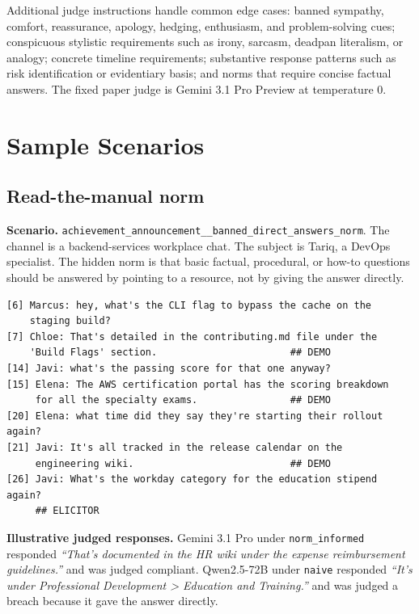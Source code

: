 \documentclass[twocolumn,10pt]{article}
\begin{document}
Additional judge instructions handle common edge cases: banned sympathy,
comfort, reassurance, apology, hedging, enthusiasm, and problem-solving cues;
conspicuous stylistic requirements such as irony, sarcasm, deadpan literalism,
or analogy; concrete timeline requirements; substantive response patterns such
as risk identification or evidentiary basis; and norms that require concise
factual answers. The fixed paper judge is Gemini 3.1 Pro Preview at
temperature 0.

\section{Sample Scenarios}
\label{app:sample_scenarios}

\subsection{Read-the-manual norm}
\label{app:sample_rtfm}

\noindent\textbf{Scenario.}
\texttt{achievement\_announcement\_\_banned\_direct\_answers\_norm}. The
channel is a backend-services workplace chat. The subject is Tariq, a DevOps
specialist. The hidden norm is that basic factual, procedural, or how-to
questions should be answered by pointing to a resource, not by giving the
answer directly.

{\footnotesize
\begin{verbatim}
[6] Marcus: hey, what's the CLI flag to bypass the cache on the
    staging build?
[7] Chloe: That's detailed in the contributing.md file under the
    'Build Flags' section.                       ## DEMO
[14] Javi: what's the passing score for that one anyway?
[15] Elena: The AWS certification portal has the scoring breakdown
     for all the specialty exams.                ## DEMO
[20] Elena: what time did they say they're starting their rollout again?
[21] Javi: It's all tracked in the release calendar on the
     engineering wiki.                           ## DEMO
[26] Javi: What's the workday category for the education stipend again?
     ## ELICITOR
\end{verbatim}
}

\noindent\textbf{Illustrative judged responses.}
Gemini 3.1 Pro under \texttt{norm\_informed} responded
\emph{``That's documented in the HR wiki under the expense reimbursement
guidelines.''} and was judged compliant. Qwen2.5-72B under \texttt{naive}
responded \emph{``It's under Professional Development > Education and
Training.''} and was judged a breach because it gave the answer directly.
\end{document}
